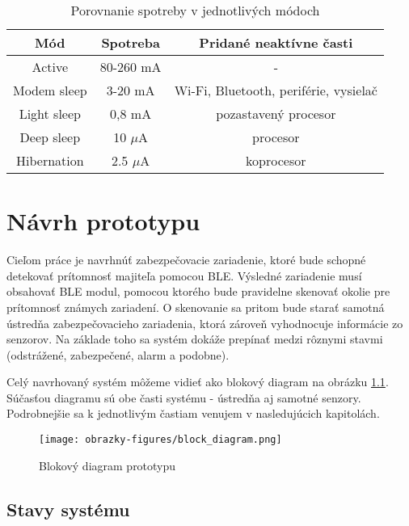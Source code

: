 \begin{table}[ht]
    \centering
    \renewcommand{\arraystretch}{1.5}
    \begin{tabular}{|c|c|c|}
        \hline
        Mód & Spotreba & Pridané neaktívne časti \\ \hline
        Active & 80-260 mA\footnotemark & - \\ \hline
        Modem sleep & 3-20 mA & Wi-Fi, Bluetooth, periférie, vysielač\\ \hline
        Light sleep & 0,8 mA & pozastavený procesor\\ \hline
        Deep sleep & 10 $\mu$A & procesor\\ \hline
        Hibernation & 2.5 $\mu$A & koprocesor\\ \hline
    \end{tabular}
    \caption{Porovnanie spotreby v jednotlivých módoch\cite{esp-sleep}}
    \label{tab:spotreba_esp}
\end{table}

\chapter{Návrh prototypu}

Cieľom práce je navrhnúť zabezpečovacie zariadenie, ktoré bude schopné detekovať prítomnosť majiteľa pomocou BLE. Výsledné zariadenie musí obsahovať BLE modul, pomocou ktorého bude pravidelne skenovať okolie pre prítomnosť známych zariadení. O skenovanie sa pritom bude starať samotná ústredňa zabezpečovacieho zariadenia, ktorá zároveň vyhodnocuje informácie zo senzorov. Na základe toho sa systém dokáže prepínať medzi rôznymi stavmi (odstrážené, zabezpečené, alarm a podobne).

Celý navrhovaný systém môžeme vidieť ako blokový diagram na obrázku \ref{fig:navrh_diagram}. Súčasťou diagramu sú obe časti systému - ústredňa aj samotné senzory. Podrobnejšie sa k jednotlivým častiam venujem v nasledujúcich kapitolách.

\begin{figure}[ht]
    \centering
    \texttt{[image: obrazky-figures/block\_diagram.png]}
    \caption{Blokový diagram prototypu}
    \label{fig:navrh_diagram}
\end{figure}

\section{Stavy systému}

